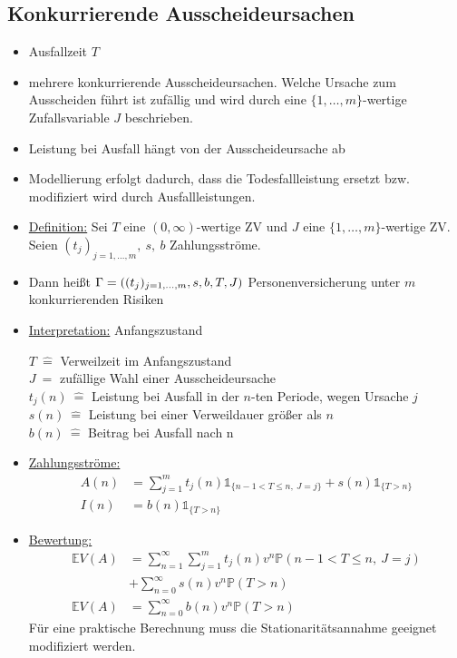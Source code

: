 \subsection{Konkurrierende Ausscheideursachen}
\label{sub:ausscheideursachen}
\begin{itemize}
	\item Ausfallzeit $T$
	\item mehrere konkurrierende Ausscheideursachen. Welche Ursache zum Ausscheiden führt ist zufällig und wird durch eine $\{1,\dots,m\}$-wertige Zufallsvariable $J$ beschrieben.
	\item Leistung bei Ausfall hängt von der Ausscheideursache ab
	\item Modellierung erfolgt dadurch, dass die Todesfallleistung ersetzt bzw. modifiziert wird durch Ausfallleistungen.
	\item \uline{Definition:} Sei $T$ eine $(0,\infty)$-wertige ZV und $J$ eine $\{1,\dots,m\}$-wertige ZV. Seien $(t_j)_{j=1,\dots,m},~s,~b$ Zahlungsströme.
	\item Dann heißt $\Gamma=\left( (t_j)_{j=1,\dots,m},s,b,T,J\right)$ Personenversicherung unter $m$ konkurrierenden Risiken
	\item \uline{Interpretation:} Anfangszustand\\
	\begin{center}
		$T~\mathrel{\hat{=}}$ Verweilzeit im Anfangszustand\\
		$J~\mathrel{\hat{=}}$ zufällige Wahl einer Ausscheideursache\\
		$t_j(n)~\mathrel{\hat{=}}$ Leistung bei Ausfall in der $n$-ten Periode, wegen Ursache $j$\\
		$s(n)~\mathrel{\hat{=}}$ Leistung bei einer Verweildauer größer als $n$\\
		$b(n)~\mathrel{\hat{=}}$ Beitrag bei Ausfall nach n
	\end{center}
	\item \uline{Zahlungsströme:}
	\begin{equation*}
	\begin{aligned}
		A(n) &= \sum_{j=1}^{m}t_j(n)\mathbb{1}_{\{n-1<T\le n,~J=j \}}+s(n)\mathbb{1}_{\{T>n\}}\\
		I(n) &= b(n)\mathbb{1}_{\{T>n\}}
	\end{aligned}
	\end{equation*}
	\item \uline{Bewertung:}
	\begin{equation*}
	\begin{aligned}
		\mathds{E}V(A) &= \sum_{n=1}^{\infty}\sum_{j=1}^{m}t_j(n)v^n\mathds{P}(n-1<T\le n,~J=j)\\
		&+ \sum_{n=0}^{\infty}s(n)v^n\mathds{P}(T>n)\\
		\mathds{E}V(A) &= \sum_{n=0}^{\infty}b(n)v^n\mathds{P}(T>n)
	\end{aligned}
	\end{equation*}
	Für eine praktische Berechnung muss die Stationaritätsannahme geeignet modifiziert werden.\\
\end{itemize}

